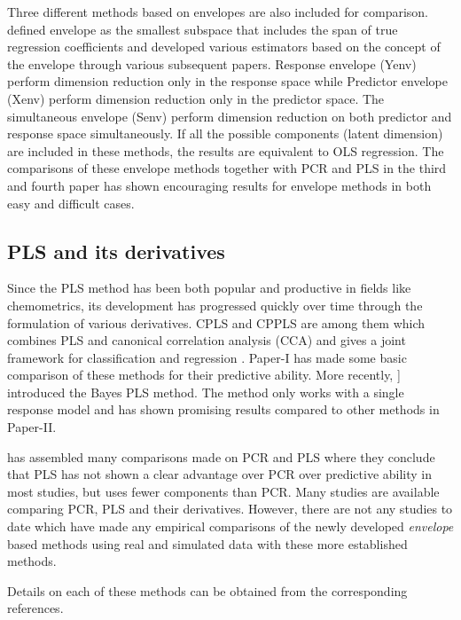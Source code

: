 \documentclass[11pt,twoside,openright,titlepage,
  headinclude,footinclude,BCOR=5mm,
  numbers=noenddot,cleardoublepage=empty,
  tablecaptionabove, dottedtoc,
  bibliography=totoc,paper=a4]{scrreprt}
\begin{document}
Three different methods based on envelopes are also included for comparison. \citet{Cook2007a} defined envelope as the smallest subspace that includes the span of true regression coefficients and developed various estimators based on the concept of the envelope through various subsequent papers. Response envelope (Yenv) \citep{cook2010envelope} perform dimension reduction only in the response space while Predictor envelope (Xenv) \citep{cook2013envelopes} perform dimension reduction only in the predictor space. The simultaneous envelope (Senv) \citep{cook2015simultaneous} perform dimension reduction on both predictor and response space simultaneously. If all the possible components (latent dimension) are included in these methods, the results are equivalent to OLS regression. The comparisons of these envelope methods together with PCR and PLS in the third and fourth paper has shown encouraging results for envelope methods in both easy and difficult cases.

\hypertarget{pls-and-its-derivatives}{%
\subsection{PLS and its derivatives}\label{pls-and-its-derivatives}}

Since the PLS method has been both popular and productive in fields like chemometrics, its development has progressed quickly over time through the formulation of various derivatives. CPLS and CPPLS are among them which combines PLS and canonical correlation analysis (CCA) and gives a joint framework for classification and regression \citep{indahl2009canonical}. Paper-I has made some basic comparison of these methods for their predictive ability. More recently, \citet{helland2012near}{]} introduced the Bayes PLS method. The method only works with a single response model and has shown promising results compared to other methods in Paper-II.

\citet{WENTZELL2003257} has assembled many comparisons made on PCR and PLS where they conclude that PLS has not shown a clear advantage over PCR over predictive ability in most studies, but uses fewer components than PCR. Many studies are available comparing PCR, PLS and their derivatives. However, there are not any studies to date which have made any empirical comparisons of the newly developed \emph{envelope} based methods using real and simulated data with these more established methods.

Details on each of these methods can be obtained from the corresponding references.
\end{document}
